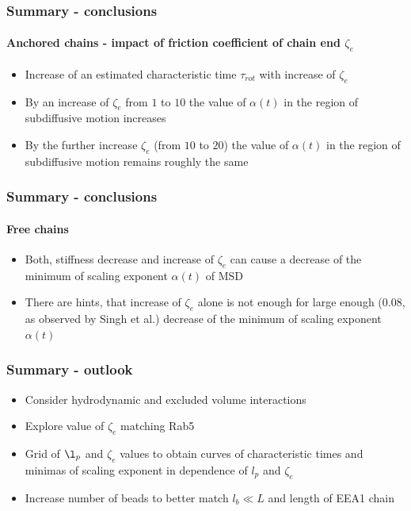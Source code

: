 \documentclass[handout]{beamer}
\begin{document}
\begin{frame}
    \frametitle{Summary - conclusions}
    \framesubtitle{Anchored chains - impact of friction coefficient of chain end $\zeta_e$}
    \begin{itemize}
        \item Increase of an estimated characteristic time $\tau_{rot}$ 
        with increase of $\zeta_e$
        \item By an increase of $\zeta_e$ from $1$ to $10$ the value of $\alpha(t)$ in the region
        of subdiffusive motion increases
        \item By the further increase $\zeta_e$ (from $10$ to $20$) the value of $\alpha(t)$ in the region
        of subdiffusive motion remains roughly the same
    \end{itemize}
\end{frame}

\begin{frame}
    \frametitle{Summary - conclusions}
    \framesubtitle{Free chains}
    \begin{itemize}
        \item Both, stiffness decrease and increase of $\zeta_e$ can cause a decrease
        of the minimum of scaling exponent $\alpha(t)$ of MSD
        \item There are hints, that increase of $\zeta_e$ alone is not enough for
        large enough (0.08, as observed by Singh et al.) decrease of the minimum of scaling exponent $\alpha(t)$ 
    \end{itemize}
\end{frame}


\begin{frame}
    \frametitle{Summary - outlook}
    \begin{itemize}
        \item Consider hydrodynamic and excluded volume interactions
        \item Explore value of $\zeta_e$ matching Rab5
        \item Grid of $\l_p$ and $\zeta_e$ values to obtain curves
        of characteristic times and minimas of scaling exponent in dependence of
        $l_p$ and $\zeta_e$
        \item Increase number of beads to better match $l_b \ll L$ and
        length of EEA1 chain
    \end{itemize}
\end{frame}
\end{document}
